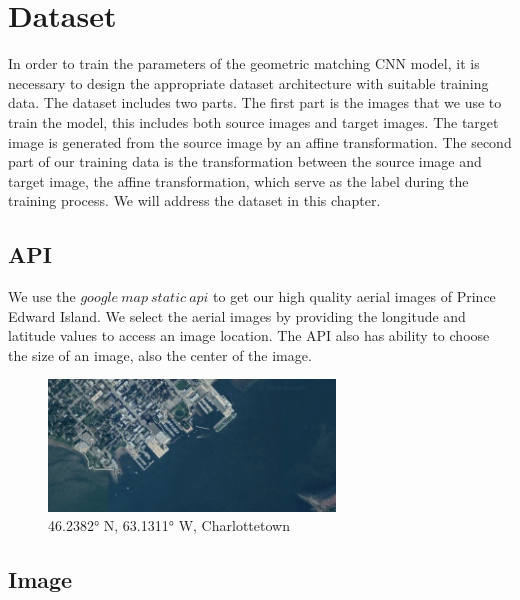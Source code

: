 \chapter{Dataset}
In order to train the parameters of the geometric matching CNN model, it is necessary to design the appropriate dataset architecture with suitable training data. The dataset includes two parts. The first part is the images that we use to train the model, this includes both source images and target images. The target image is generated from the source image by an affine transformation. The second part of our training data is the transformation between the source image and target image, the affine transformation, which serve as the label during the training process. We will address the dataset in this chapter.
\section{API}
We use the $google\ map\ static\ api $ to get our high quality aerial images of Prince Edward Island. We select the aerial images by providing the longitude and latitude values to access an image location. The API also has ability to choose the size of an image, also the center of the image. 

\begin{figure}
 \centering
    \includegraphics[width=3.0in]{figs/charlottetown}
    \caption{46.2382° N, 63.1311° W, Charlottetown}
\end{figure}


\section{Image}

